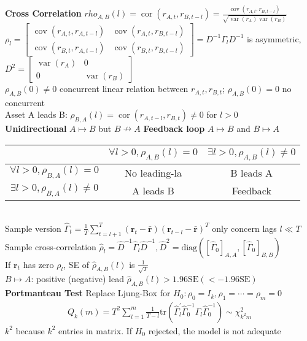 \documentclass[10pt,landscape, a4paper]{article}
\theoremstyle{remark}
\newcommand{\var}{\operatorname{var}}
\newcommand{\cov}[1]{\operatorname{cov}(#1)}
\newcommand{\SE}{\mathrm{SE}}
\begin{document}
\begin{multicols*}{3}
\textbf{Cross Correlation} $rho_{A, B} (l) = \operatorname{cor}(r_{A, t}, r_{B, t-l}) = \frac{\cov{r_{A, t}, r_{B, t-l}}}{\sqrt{\var(r_A) \var(r_B)}}$\\
$\rho_l = \begin{bmatrix}
    \cov{r_{A, t}, r_{A, t-l}} &\cov{r_{A, t}, r_{B, t-l}}\\
    \cov{r_{B, t}, r_{A, t-l}} &\cov{r_{B, t}, r_{B, t-l}}
\end{bmatrix} = D^{-1}\Gamma_l D^{-1}$ is asymmetric, 
$D^2 = \begin{bmatrix}
    \var(r_A)&0\\0&\var(r_B)
\end{bmatrix}$\\
$\rho_{A, B} (0) \neq 0$ concurrent linear relation between $r_{A ,t}, r_{B, t}$; $\rho_{A, B} (0) = 0$ no concurrent\\
Asset A leads B: $\rho_{B, A} (l) = \operatorname{cor} (r_{A, t-l}, r_{B, t}) \neq 0$ for $l> 0$\\
\textbf{Unidirectional} $A \mapsto B$ but $B \nrightarrow A$ \textbf{Feedback loop} $A\mapsto B$ and $B\mapsto A$\\
\begin{tabular}{|c|c|c|}\hline
     &$\forall l>0, \rho_{A, B} (l) = 0$ &$\exists l>0, \rho_{A, B} (l) \neq 0$  \\ \hline
   $\forall l>0, \rho_{B, A} (l) = 0$  &No leading-la &B leads A \\ \hline
   $\exists l>0, \rho_{B, A} (l) \neq 0$ &A leads B &Feedback \\ \hline
\end{tabular}\\
Sample version $\hat{\Gamma}_t = \frac{1}{T} \sum^T_{t=l+1} (\bm{r}_t - \bar{\bm{r}}) (\bm{r}_{t-l} - \bar{\bm{r}})^T $ only concern lags $l \ll T$\\
Sample cross-correlation $\hat{\rho}_l = \hat{D}^{-1} \hat{\Gamma}_l \hat{D}^{-1}, \hat{D}^2 = \mathrm{diag} ([\hat{\Gamma}_0]_{A, A}, [\hat{\Gamma}_0]_{B, B})$\\
If $\bm{r}_t$ has zero $\rho_l$, SE of $\hat{\rho}_{A, B} (l)$ is $\frac{1}{\sqrt{T}}$\\
$B\mapsto A$: positive (negative) lead $\hat{\rho}_{A, B} (l) > 1.96\SE (<-1.96\SE)$\\

\textbf{Portmanteau Test} Replace Ljung-Box for $H_0: \rho_0 = I_k, \rho_1 = \cdots = \rho_m = 0$
\begin{align*}
    Q_k (m) = T^2 \sum^m_{l=1} \frac{1}{T-l} \mathrm{tr} (\hat{\Gamma}^{\prime}_l \hat{\Gamma}^{-1}_0 \hat{\Gamma}_l \hat{\Gamma}^{-1}_0) \sim \chi^2_{k^2 m}
\end{align*}
$k^2$ because $k^2$ entries in matrix. If $H_0$ rejected, the model is not adequate\\


\end{multicols*}
\end{document}
